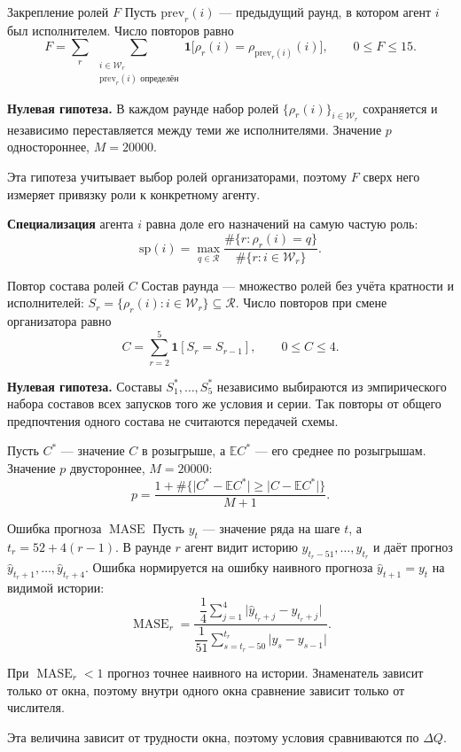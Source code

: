 \documentclass[aspectratio=169,11pt]{beamer}
\DeclareMathOperator{\MASE}{MASE}
\newcommand{\ind}{\mathbf 1}
\begin{document}
\begin{frame}{Закрепление ролей $F$}
\small Пусть $\mathrm{prev}_r(i)$ --- предыдущий раунд, в котором агент $i$ был исполнителем. Число повторов равно
\[F=\sum_{r}\ \sum_{\substack{i\in\mathcal W_r\\ \mathrm{prev}_r(i)\text{ определён}}}\ind\bigl[\rho_r(i)=\rho_{\mathrm{prev}_r(i)}(i)\bigr],\qquad 0\le F\le 15.\]

\textbf{Нулевая гипотеза.} В каждом раунде набор ролей $\{\rho_r(i)\}_{i\in\mathcal W_r}$ сохраняется и независимо переставляется между теми же исполнителями. Значение $p$ одностороннее, $M=20000$.

\medskip
Эта гипотеза учитывает выбор ролей организаторами, поэтому $F$ сверх него измеряет привязку роли к конкретному агенту.

\medskip
\textbf{Специализация} агента $i$ равна доле его назначений на самую частую роль:
\[\mathrm{sp}(i)=\max_{q\in\mathcal R}\frac{\#\{r:\rho_r(i)=q\}}{\#\{r:i\in\mathcal W_r\}}.\]
\end{frame}

\begin{frame}{Повтор состава ролей $C$}
\small Состав раунда --- множество ролей без учёта кратности и исполнителей: $S_r=\{\rho_r(i):i\in\mathcal W_r\}\subseteq\mathcal R$. Число повторов при смене организатора равно
\[C=\sum_{r=2}^{5}\ind[S_r=S_{r-1}],\qquad 0\le C\le 4.\]

\textbf{Нулевая гипотеза.} Составы $S_1^\ast,\dots,S_5^\ast$ независимо выбираются из эмпирического набора составов всех запусков того же условия и серии. Так повторы от общего предпочтения одного состава не считаются передачей схемы.

\medskip
Пусть $C^\ast$ --- значение $C$ в розыгрыше, а $\mathbb E C^\ast$ --- его среднее по розыгрышам. Значение $p$ двустороннее, $M=20000$:
\[p=\frac{1+\#\{\lvert C^\ast-\mathbb E C^\ast\rvert\ge\lvert C-\mathbb E C^\ast\rvert\}}{M+1}.\]
\end{frame}

\begin{frame}{Ошибка прогноза $\MASE$}
\small Пусть $y_t$ --- значение ряда на шаге $t$, а $t_r=52+4(r-1)$. В раунде $r$ агент видит историю $y_{t_r-51},\dots,y_{t_r}$ и даёт прогноз $\hat y_{t_r+1},\dots,\hat y_{t_r+4}$. Ошибка нормируется на ошибку наивного прогноза $\hat y_{t+1}=y_t$ на видимой истории:
\[\MASE_r=\frac{\dfrac14\displaystyle\sum_{j=1}^{4}\bigl\lvert\hat y_{t_r+j}-y_{t_r+j}\bigr\rvert}{\dfrac1{51}\displaystyle\sum_{s=t_r-50}^{t_r}\lvert y_s-y_{s-1}\rvert}.\]

При $\MASE_r<1$ прогноз точнее наивного на истории. Знаменатель зависит только от окна, поэтому внутри одного окна сравнение зависит только от числителя.

\medskip
Эта величина зависит от трудности окна, поэтому условия сравниваются по $\Delta Q$.
\end{frame}
\end{document}
